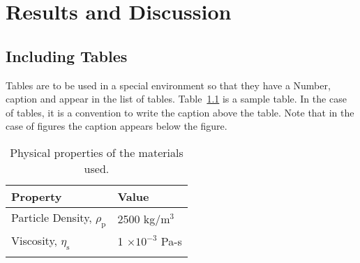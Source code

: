 \chapter{Results and Discussion}


\section{Including Tables}

Tables are to be used in a special environment so that they have a
Number, caption and appear in the list of tables.
Table~\ref{tab:samtab} is a sample table. In the case of tables, it is
a convention to write the caption above the table.  Note that in the
case of figures the caption appears below the figure.

\begin{table}[tbp]
  \begin{center}
    \caption{Physical properties of the materials used.}
    \label{tab:samtab}
    \begin{tabular}{ll}
      \toprule 
      Property & Value \\
      \midrule
      Particle Density, $\rho_{\mathrm{p}}$ & 2500 kg/m$^{3}$ \\
      Viscosity, $\eta_{\mathrm{s}}$& 1 $\times 10^{-3}$ Pa-s \\
      \bottomrule \\
    \end{tabular}
  \end{center}
\end{table}

